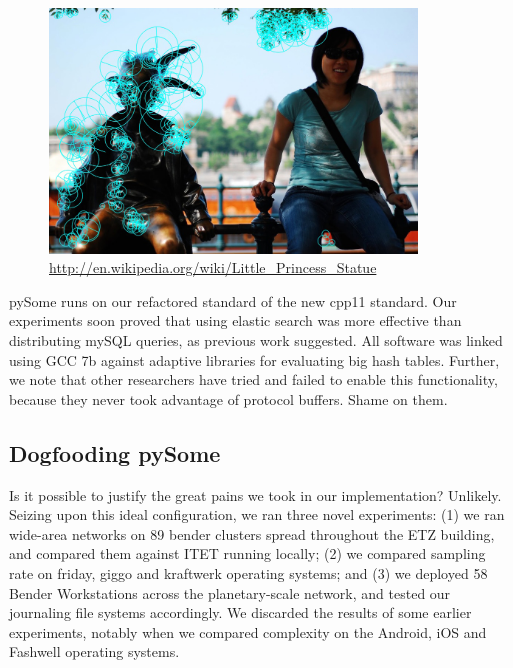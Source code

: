 \documentclass[runningheads]{llncs}
\begin{document}
\begin{figure} \centering \includegraphics[height=6.5cm]{images/yao2.jpg}
\caption{ \url{http://en.wikipedia.org/wiki/Little_Princess_Statue} } \label{fig:label1} \end{figure}

 pySome runs on our refactored standard of the new cpp11 standard. 
 Our experiments soon proved that using elastic search was more effective than
 distributing mySQL queries, as previous work suggested. All software was linked
 using GCC 7b against adaptive libraries for
 evaluating big hash tables. Further, we note that other researchers have
 tried and failed to enable this functionality, because they never took advantage of protocol buffers. Shame on them. 

\subsection{Dogfooding pySome}
Is it possible to justify the great pains we took in our implementation?
Unlikely. Seizing upon this ideal configuration, we ran three novel
experiments: (1) we ran wide-area networks on 89 bender clusters spread throughout
the ETZ building, and compared them against ITET running locally;
(2) we compared sampling rate on friday, giggo and kraftwerk operating systems; 
 and (3) we deployed 58 Bender Workstations across the
planetary-scale network, and tested our journaling file systems
accordingly. We discarded the results of some earlier experiments,
notably when we compared complexity on the Android, iOS and Fashwell
operating systems.
\end{document}

